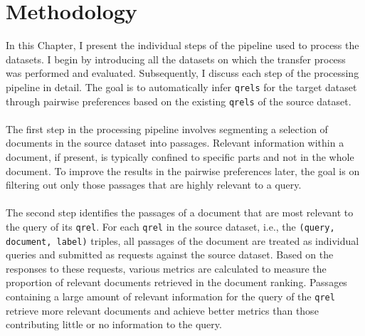 \chapter{Methodology}\label{methodology}

In this Chapter, I present the individual steps of the pipeline used to process the datasets. I begin by introducing all the datasets on which the transfer process was performed and evaluated. Subsequently, I discuss each step of the processing pipeline in detail. The goal is to automatically infer \texttt{qrels} for the target dataset through pairwise preferences based on the existing \texttt{qrels} of the source dataset.
\\\\
The first step in the processing pipeline involves segmenting a selection of documents in the source dataset into passages. Relevant information within a document, if present, is typically confined to specific parts and not in the whole document. To improve the results in the pairwise preferences later, the goal is on filtering out only those passages that are highly relevant to a query.
\\\\
The second step identifies the passages of a document that are most relevant to the query of its \texttt{qrel}. For each \texttt{qrel} in the source dataset, i.e., the \texttt{(query, document, label)} triples, all passages of the document are treated as individual queries and submitted as requests against the source dataset. Based on the responses to these requests, various metrics are calculated to measure the proportion of relevant documents retrieved in the document ranking. Passages containing a large amount of relevant information for the query of the \texttt{qrel} retrieve more relevant documents and achieve better metrics than those contributing little or no information to the query.

\pagebreak

